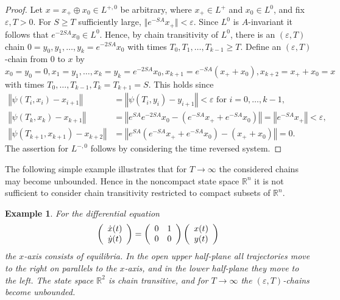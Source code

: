\documentclass{siamltex}%
\newtheorem{example}[theorem]{Example}
\begin{document}
\begin{proof}
Let $x=x_{+}\oplus x_{0}\in L^{+,0}$ be arbitrary, where $x_{+}\in L^{+}$ and
$x_{0}\in L^{0}$, and fix $\varepsilon,T>0$. For $S\geq T$ sufficiently large,
$\Vert e^{-SA}x_{+}\Vert<\varepsilon$. Since $L^{0}$ is $A$-invariant it
follows that $e^{-2SA}x_{0}\in L^{0}$. Hence, by chain transitivity of $L^{0}%
$, there is an $(\varepsilon,T)$ chain $0=y_{0},y_{1},\ldots,y_{k}%
=e^{-2SA}x_{0}$ with times $T_{0},T_{1},\ldots,T_{k-1}\geq T$. Define an
$(\varepsilon,T)$-chain from $0$ to $x$ by $x_{0}=y_{0}=0,x_{1}=y_{1}%
,\ldots,x_{k}=y_{k}=e^{-2SA}x_{0},x_{k+1}=e^{-SA}\left(  x_{+}+x_{0}\right)
,x_{k+2}=x_{+}+x_{0}=x$ with times $T_{0},\ldots,T_{k-1},T_{k}=T_{k+1}=S$.
This holds since%
\begin{align*}
\left\Vert \psi(T_{i},x_{i})-x_{i+1}\right\Vert  &  =\left\Vert \psi
(T_{i},y_{i})-y_{i+1}\right\Vert <\varepsilon\text{ for }i=0,\ldots,k-1,\\
\left\Vert \psi(T_{k},x_{k})-x_{k+1}\right\Vert  &  =\left\Vert e^{SA}%
e^{-2SA}x_{0}-\left(  e^{-SA}x_{+}+e^{-SA}x_{0}\right)  \right\Vert
=\left\Vert e^{-SA}x_{+}\right\Vert <\varepsilon,\\
\left\Vert \psi(T_{k+1},x_{k+1})-x_{k+2}\right\Vert  &  =\left\Vert
e^{SA}\left(  e^{-SA}x_{+}+e^{-SA}x_{0}\right)  -\left(  x_{+}+x_{0}\right)
\right\Vert =0.
\end{align*}
The assertion for $L^{-,0}$ follows by considering the time reversed system.
\end{proof}

The following simple example illustrates that for $T\rightarrow\infty$ the
considered chains may become unbounded. Hence in the noncompact state space
$\mathbb{R}^{n}$ it is not sufficient to consider chain transitivity
restricted to compact subsets of $\mathbb{R}^{n}$.

\begin{example}
For the differential equation%
\[
\left(
\begin{array}
[c]{c}%
\dot{x}(t)\\
\dot{y}(t)
\end{array}
\right)  =\left(
\begin{array}
[c]{cc}%
0 & 1\\
0 & 0
\end{array}
\right)  \left(
\begin{array}
[c]{c}%
x(t)\\
y(t)
\end{array}
\right)
\]
the $x$-axis consists of equilibria. In the open upper half-plane all
trajectories move to the right on parallels to the $x$-axis, and in the lower
half-plane they move to the left. The state space $\mathbb{R}^{2}$ is chain
transitive, and for $T\rightarrow\infty$ the $(\varepsilon,T)$-chains become unbounded.
\end{example}
\end{document}

